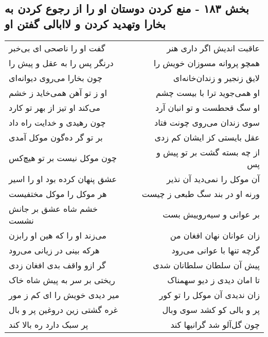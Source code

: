 \begin{center}
\section*{بخش ۱۸۳ - منع کردن دوستان او را از رجوع کردن به بخارا وتهدید کردن و لاابالی گفتن او}
\label{sec:sh183}
\begin{longtable}{l p{0.5cm} r}
گفت او را ناصحی ای بی‌خبر
&&
عاقبت اندیش اگر داری هنر
\\
درنگر پس را به عقل و پیش را
&&
همچو پروانه مسوزان خویش را
\\
چون بخارا می‌روی دیوانه‌ای
&&
لایق زنجیر و زندان‌خانه‌ای
\\
او ز تو آهن همی‌خاید ز خشم
&&
او همی‌جوید ترا با بیست چشم
\\
می‌کند او تیز از بهر تو کارد
&&
او سگ قحطست و تو انبان آرد
\\
چون رهیدی و خدایت راه داد
&&
سوی زندان می‌روی چونت فتاد
\\
بر تو گر ده‌گون موکل آمدی
&&
عقل بایستی کز ایشان کم زدی
\\
چون موکل نیست بر تو هیچ‌کس
&&
از چه بسته گشت بر تو پیش و پس
\\
عشق پنهان کرده بود او را اسیر
&&
آن موکل را نمی‌دید آن نذیر
\\
هر موکل را موکل مختفیست
&&
ورنه او در بند سگ طبعی ز چیست
\\
خشم شاه عشق بر جانش نشست
&&
بر عوانی و سیه‌روییش بست
\\
می‌زند او را که هین او رابزن
&&
زان عوانان نهان افغان من
\\
هرکه بینی در زیانی می‌رود
&&
گرچه تنها با عوانی می‌رود
\\
گر ازو واقف بدی افغان زدی
&&
پیش آن سلطان سلطانان شدی
\\
ریختی بر سر به پیش شاه خاک
&&
تا امان دیدی ز دیو سهمناک
\\
میر دیدی خویش را ای کم ز مور
&&
زان ندیدی آن موکل را تو کور
\\
غره گشتی زین دروغین پر و بال
&&
پر و بالی کو کشد سوی وبال
\\
پر سبک دارد ره بالا کند
&&
چون گل‌آلو شد گرانیها کند
\\
\end{longtable}
\end{center}
